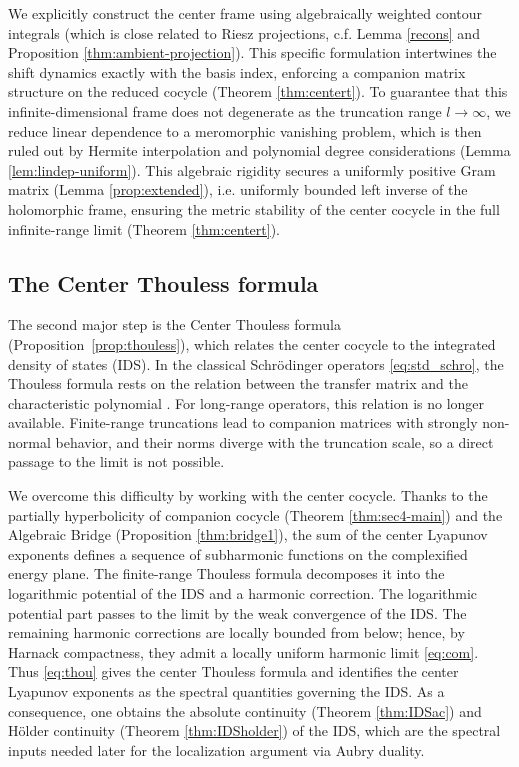 \documentclass[reqno,11pt]{amsart}
\begin{document}
 
We explicitly construct the center frame using algebraically weighted contour integrals (which is close related to Riesz projections, c.f. Lemma \ref{recons} and Proposition \ref{thm:ambient-projection}). This specific formulation intertwines the shift dynamics exactly with the basis index,  enforcing a companion matrix structure on the reduced cocycle (Theorem \ref{thm:centert}). To guarantee that this infinite-dimensional frame does not degenerate as the truncation range $l \to \infty$, we reduce linear dependence to a meromorphic vanishing problem, which is then ruled out by Hermite interpolation and polynomial degree considerations (Lemma \ref{lem:lindep-uniform}). This algebraic rigidity secures a uniformly positive Gram matrix (Lemma \ref{prop:extended}), i.e. uniformly bounded
left inverse of the holomorphic frame, ensuring the metric stability of the center cocycle in the full infinite-range limit (Theorem \ref{thm:centert}).








\subsection{The Center Thouless formula}


The second major step is the Center Thouless formula (Proposition~\ref{prop:thouless}), which relates the center cocycle to the integrated density of states (IDS). In the classical Schr\"odinger operators \eqref{eq:std_schro}, the Thouless formula rests on the relation between the transfer matrix and the characteristic polynomial \cite{AS}. For long-range operators, this relation is no longer available. Finite-range truncations lead to companion matrices with strongly non-normal behavior, and their norms diverge with the truncation scale, so a direct passage to the limit is not possible.

We overcome this difficulty by working with the center cocycle. Thanks to the partially hyperbolicity of companion cocycle (Theorem \ref{thm:sec4-main}) and the Algebraic Bridge (Proposition \ref{thm:bridge1}),   the sum of the center Lyapunov exponents defines a sequence of subharmonic functions on the complexified energy plane. 
The finite-range Thouless formula
decomposes it into the logarithmic potential of the IDS and a harmonic
correction. The logarithmic potential part passes to the limit by the weak
convergence of the IDS. The remaining harmonic corrections are locally bounded
from below; hence, by Harnack compactness, they admit a locally uniform
harmonic limit \eqref{eq:com}.  Thus \eqref{eq:thou} gives the center Thouless formula and identifies the center Lyapunov exponents as the spectral quantities governing the IDS.
As a consequence, one obtains the absolute continuity (Theorem \ref{thm:IDSac}) and H\"older continuity (Theorem \ref{thm:IDSholder}) of the IDS, which are the spectral inputs needed later for the localization argument via Aubry duality.
\end{document}
